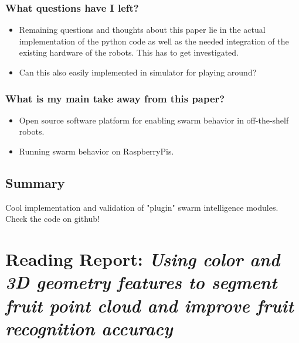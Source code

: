     \subsubsection*{What questions have I left?}
    \begin{itemize}
        \item Remaining questions and thoughts about this paper lie in the actual implementation of the python code as well as the needed integration of the existing hardware of the robots. This has to get investigated.
        \item Can this also easily implemented in simulator for playing around?
    \end{itemize}
    \subsubsection*{What is my main take away from this paper?}
    \begin{itemize}
        \item Open source software platform for enabling swarm behavior in off-the-shelf robots.
        \item Running swarm behavior on RaspberryPis.
    \end{itemize}
    
    \subsection*{Summary}
    Cool implementation and validation of "plugin" swarm intelligence modules. Check the code on github!

    \newpage
    \section{Reading Report: \emph{Using color and 3D geometry features to segment fruit point cloud and improve fruit recognition accuracy}}
    \label{sec:Wu2020}
    \cite{Wu2020}
    
